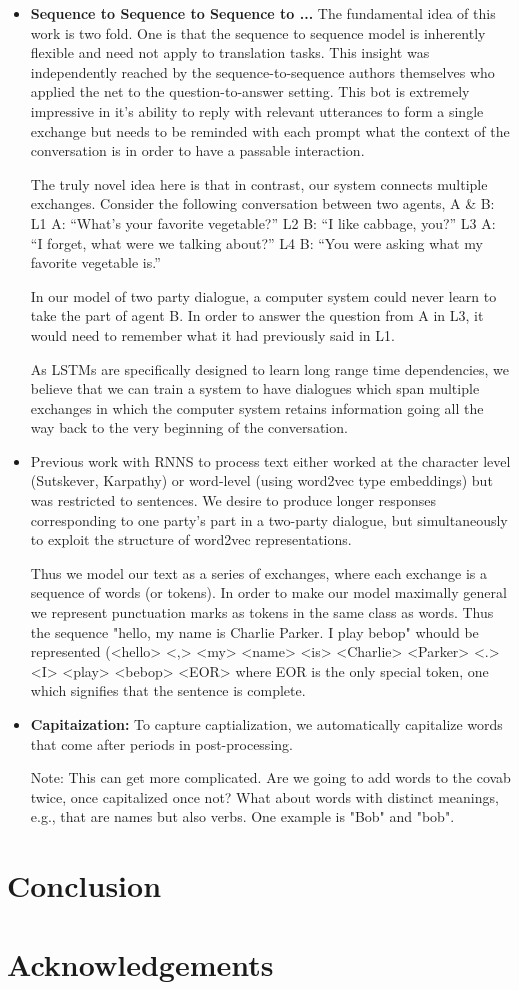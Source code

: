 \documentclass[]{article}
\begin{document}
\begin{itemize}


\item \textbf{ Sequence to Sequence to Sequence to ...} The fundamental idea of this work is two fold. One is that the sequence to sequence model is inherently flexible and need not apply to translation tasks. This insight was independently reached by the sequence-to-sequence authors themselves who applied the net to the question-to-answer setting. This bot is extremely impressive in it's ability to reply with relevant utterances to form a single exchange but needs to be reminded with each prompt what the context of the conversation is in order to have a passable interaction.

The truly novel idea here is that in contrast, our system connects multiple exchanges.
Consider the following conversation between two agents, A \& B:
L1  A:  “What’s your favorite vegetable?”
L2  B:  “I like cabbage, you?”
L3  A:  “I forget, what were we talking about?”
L4  B:  “You were asking what my favorite vegetable is.”

In our model of two party dialogue, a computer system could never learn to take the part of agent B. In order to answer the question from A in L3, it would need to remember what it had previously said in L1.

As LSTMs are specifically designed to learn long range time dependencies, we believe that we can train a system to have dialogues which span multiple exchanges in which the computer system retains information going all the way back to the very beginning of the conversation.

\item Previous work with RNNS to process text either worked at the character level (Sutskever, Karpathy) or word-level (using word2vec type embeddings) but was restricted to sentences. We desire to produce longer responses corresponding to one party's part in a two-party dialogue, but simultaneously to exploit the structure of word2vec representations.

Thus we model our text as a series of exchanges, where each exchange is a sequence of words (or tokens). In order to make our model maximally general we represent punctuation marks as tokens in the same class as words. Thus the sequence "hello, my name is Charlie Parker. I play bebop" whould be represented (<hello> <,> <my> <name> <is> <Charlie> <Parker> <.> <I> <play> <bebop> <EOR> where EOR is the only special token, one which signifies that the sentence is complete.

\item \textbf{Capitaization:} To capture captialization, we automatically capitalize words that come after periods in post-processing.

Note: This can get more complicated. Are we going to add words to the covab twice, once capitalized once not? What about words with distinct meanings, e.g., that are names but also verbs. One example is "Bob" and "bob".

\end{itemize}


\section{Conclusion}
\section{Acknowledgements}


\end{document}
